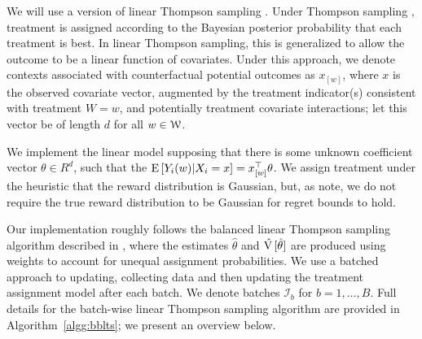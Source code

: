 \documentclass[letterpaper, 12pt, parskip=full,DIV=10]{scrartcl}
\begin{document}
We will use a version of linear Thompson sampling \citep{agrawal2013thompson}. Under Thompson sampling \citep{thompson1933likelihood,thompson1935theory}, treatment is assigned according to the Bayesian posterior probability that each treatment is best. In linear Thompson sampling, this is generalized to allow the outcome to be a linear function of covariates. Under this approach, we denote contexts associated with counterfactual potential outcomes as $x_{[w]}$, where $x$ is the observed covariate vector, augmented by the treatment indicator(s) consistent with treatment $W =w$, and potentially treatment covariate interactions; let this vector be of length $d$ for all $w \in {\EuScript W}$. 

We implement the linear model supposing that there is some unknown coefficient vector $\theta\in R^{d}$, such that the ${\textrm E}\,[Y_i(w)|X_i = x] = x_{[w]}^\top \theta$. %
We assign treatment under the heuristic that the reward distribution is Gaussian, but, as \cite{agrawal2013thompson} note, we do not require the true reward distribution to be Gaussian for regret bounds to hold. 



Our implementation roughly follows the balanced linear Thompson sampling algorithm described in \cite{dimakopoulou2017estimation, dimakopoulou2019balanced}, where the estimates $\hat\theta$ and $\hat{{\textrm V}\,}[\hat\theta]$ are produced using weights to account for unequal assignment probabilities. We use a batched approach to updating, collecting data and then updating the treatment assignment model after each batch. We denote batches $\mathcal{I}_b$ for $b = 1, \dots, B$. Full details for the batch-wise linear Thompson sampling algorithm are provided in Algorithm~\ref{algg:bblts}; we present an overview below. 
\end{document}
